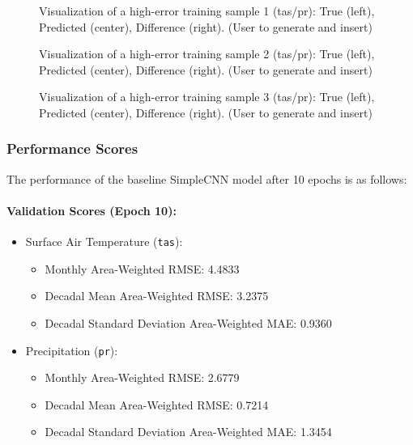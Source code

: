 \documentclass{article}
\begin{document}
\begin{figure}[h!]
  \centering
  \fbox{\rule[-.5cm]{0cm}{4cm} \rule[-.5cm]{12cm}{0cm}} %
  \caption{Visualization of a high-error training sample 1 (tas/pr): True (left), Predicted (center), Difference (right). (User to generate and insert)}
  \label{fig:high_error_sample1}
\end{figure}

\begin{figure}[h!]
  \centering
  \fbox{\rule[-.5cm]{0cm}{4cm} \rule[-.5cm]{12cm}{0cm}} %
  \caption{Visualization of a high-error training sample 2 (tas/pr): True (left), Predicted (center), Difference (right). (User to generate and insert)}
  \label{fig:high_error_sample2}
\end{figure}

\begin{figure}[h!]
  \centering
  \fbox{\rule[-.5cm]{0cm}{4cm} \rule[-.5cm]{12cm}{0cm}} %
  \caption{Visualization of a high-error training sample 3 (tas/pr): True (left), Predicted (center), Difference (right). (User to generate and insert)}
  \label{fig:high_error_sample3}
\end{figure}

\subsubsection{Performance Scores}
The performance of the baseline SimpleCNN model after 10 epochs is as follows:

\paragraph{Validation Scores (Epoch 10):}
\begin{itemize}
    \item Surface Air Temperature (\texttt{tas}):
    \begin{itemize}
        \item Monthly Area-Weighted RMSE: 4.4833
        \item Decadal Mean Area-Weighted RMSE: 3.2375
        \item Decadal Standard Deviation Area-Weighted MAE: 0.9360
    \end{itemize}
    \item Precipitation (\texttt{pr}):
    \begin{itemize}
        \item Monthly Area-Weighted RMSE: 2.6779
        \item Decadal Mean Area-Weighted RMSE: 0.7214
        \item Decadal Standard Deviation Area-Weighted MAE: 1.3454
    \end{itemize}
\end{itemize}
\end{document}
